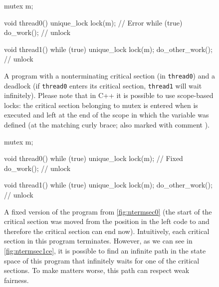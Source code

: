\begin{figure}[tp]
\begin{minipage}[t]{0.49\textwidth}
\begin{cppcode}
    mutex m;

    void thread0() {
      unique_lock lock(m); // Error
      while (true) {
        do_work();
      }
    } // unlock

    void thread1() {
      while (true) {
        unique_lock lock(m);
        do_other_work();
      } // unlock
    }
\end{cppcode}
\caption{
    A program with a nonterminating critical section (in \texttt{thread0}) and a deadlock (if \texttt{thread0} enters its critical section, \texttt{thread1} will wait infinitely).
    Please note that in C++ it is possible to use scope-based locks: the critical section belonging to mutex  is entered when  is executed and left at the end of the scope in which the  variable was defined (at the matching curly brace; also marked with comment ).
}\label{fig:ntermsec0}
\end{minipage}
%
\hfill
%
\begin{minipage}[t]{0.49\textwidth}
\begin{cppcode}
    mutex m;

    void thread0() {
      while (true) {
        unique_lock lock(m); // Fixed
        do_work();
      } // unlock
    }

    void thread1() {
      while (true) {
        unique_lock lock(m);
        do_other_work();
      } // unlock
    }
\end{cppcode}
\caption{
    A fixed version of the program from \autoref{fig:ntermsec0} (the start of the critical section was moved from the position  in the left code to  and therefore the critical section can end now).
    Intuitively, each critical section in this program terminates.
    However, as we can see in \autoref{fig:ntermsec1ce}, it is possible to find an infinite path in the state space of this program that infinitely waits for one of the critical sections.
    To make matters worse, this path can respect weak fairness.
} \label{fig:ntermsec1}
\end{minipage}
\end{figure}
